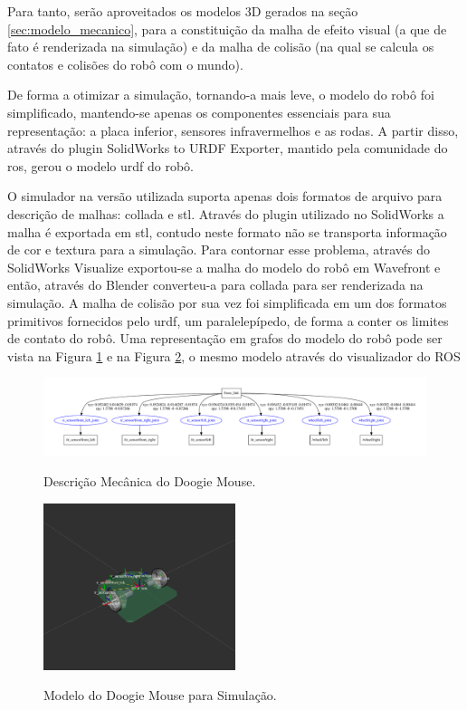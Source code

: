 Para tanto, serão aproveitados os modelos 3D gerados na seção \ref{sec:modelo_mecanico}, para a constituição da malha de efeito visual (a que de fato é renderizada na simulação) e da malha de colisão (na qual se calcula os contatos e colisões do robô com o mundo).

De forma a otimizar a simulação, tornando-a mais leve, o modelo do robô foi simplificado, mantendo-se apenas os componentes essenciais para sua representação: a placa inferior, sensores infravermelhos e as rodas. A partir disso, através do plugin SolidWorks to URDF Exporter, mantido pela comunidade do \gls*{ros}, gerou o modelo \gls*{urdf} do robô.

O simulador na versão utilizada suporta apenas dois formatos de arquivo para descrição de malhas: \gls*{collada} e \gls*{stl}. Através do plugin utilizado no SolidWorks a malha é exportada em \gls*{stl}, contudo neste formato não se transporta informação de cor e textura para a simulação. Para contornar esse problema, através do SolidWorks Visualize exportou-se a malha do modelo do robô em Wavefront e então, através do Blender converteu-a para \gls*{collada} para ser renderizada na simulação. A malha de colisão por sua vez foi simplificada em um dos formatos primitivos fornecidos pelo \gls*{urdf}, um paralelepípedo, de forma a conter os limites de contato do robô. Uma representação em grafos do modelo do robô pode ser vista na Figura \ref{fig:doogie_description} e na Figura \ref{fig:doogie_description_model}, o mesmo modelo através do visualizador do ROS

\begin{figure}[H]
	\centering
	\caption{Descrição Mecânica do Doogie Mouse.}
	\includegraphics[width=1\textwidth]
	{Figures/doogie_description}
	\label{fig:doogie_description}
\end{figure}

\begin{figure}[H]
	\centering
	\caption{Modelo do Doogie Mouse para Simulação.}
	\includegraphics[width=0.5\textwidth]
	{Figures/doogie_description_model}
	\label{fig:doogie_description_model}
\end{figure}

